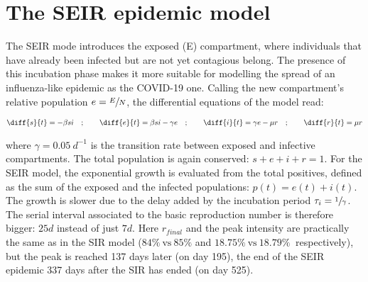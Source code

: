 \documentclass[DIV=12, BCOR=0pt]{scrartcl}  %
\begin{document}
  
  
  
 	
%  
  
  
  \section{The SEIR epidemic model}
  The SEIR mode introduces the exposed (E) compartment, where individuals that have already been infected but are not yet contagious belong. The presence of this incubation phase makes it more suitable for modelling the spread of an influenza-like epidemic as the COVID-19 one. Calling the new compartment's relative population $e = \sfrac{E}{N}$, the differential equations of the model read:
  
  \begin{align}
  	\diff{s}{t} = - \beta s i \quad;  \qquad 	\diff{e}{t} = \beta s i - \gamma e \quad; \qquad \diff{i}{t} = \gamma e - \mu r \quad; \qquad \diff{r}{t} = \mu r
  \end{align}
  
  where $\gamma = 0.05 \ d^{-1}$ is the transition rate between exposed and infective compartments. The total population is again conserved: $ s + e + i + r = 1$. For the SEIR model, the exponential growth is evaluated from the total positives, defined as the sum of the exposed and the infected populations: $p(t) = e(t) + i(t)$. The growth is slower due to the delay added by the incubation period $\tau_{i}=\sfrac{1}{\gamma}$. The serial interval associated to the basic reproduction number is therefore bigger: $25 d$ instead of just $7 d$. Here $r_{final}$ and the peak intensity are practically the same as in the SIR model ($84 \% \ \mathrm{vs} \ 85 \%$ and $18.75 \% \ \mathrm{vs} \ 18.79 \% \ $ respectively), but the peak is reached 137 days later (on day 195), the end of the SEIR epidemic 337 days after the SIR has ended (on day 525). %
  
\end{document}
